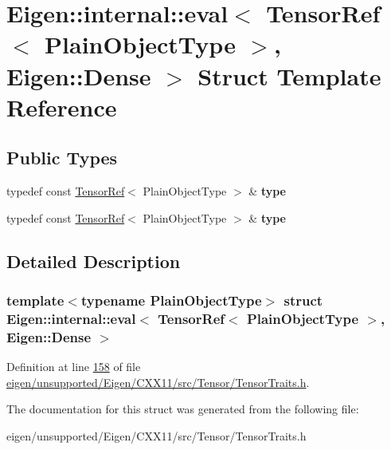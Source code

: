 \hypertarget{struct_eigen_1_1internal_1_1eval_3_01_tensor_ref_3_01_plain_object_type_01_4_00_01_eigen_1_1_dense_01_4}{}\section{Eigen\+:\+:internal\+:\+:eval$<$ Tensor\+Ref$<$ Plain\+Object\+Type $>$, Eigen\+:\+:Dense $>$ Struct Template Reference}
\label{struct_eigen_1_1internal_1_1eval_3_01_tensor_ref_3_01_plain_object_type_01_4_00_01_eigen_1_1_dense_01_4}
\subsection*{Public Types}
\begin{DoxyCompactItemize}
\item 
\mbox{\label{struct_eigen_1_1internal_1_1eval_3_01_tensor_ref_3_01_plain_object_type_01_4_00_01_eigen_1_1_dense_01_4_ab36f4b84827bbef251fdec1fd5c0707a}} 
typedef const \hyperlink{class_eigen_1_1_tensor_ref}{Tensor\+Ref}$<$ Plain\+Object\+Type $>$ \& {\bfseries type}
\item 
\mbox{\label{struct_eigen_1_1internal_1_1eval_3_01_tensor_ref_3_01_plain_object_type_01_4_00_01_eigen_1_1_dense_01_4_ab36f4b84827bbef251fdec1fd5c0707a}} 
typedef const \hyperlink{class_eigen_1_1_tensor_ref}{Tensor\+Ref}$<$ Plain\+Object\+Type $>$ \& {\bfseries type}
\end{DoxyCompactItemize}


\subsection{Detailed Description}
\subsubsection*{template$<$typename Plain\+Object\+Type$>$\newline
struct Eigen\+::internal\+::eval$<$ Tensor\+Ref$<$ Plain\+Object\+Type $>$, Eigen\+::\+Dense $>$}



Definition at line \hyperlink{eigen_2unsupported_2_eigen_2_c_x_x11_2src_2_tensor_2_tensor_traits_8h_source_l00158}{158} of file \hyperlink{eigen_2unsupported_2_eigen_2_c_x_x11_2src_2_tensor_2_tensor_traits_8h_source}{eigen/unsupported/\+Eigen/\+C\+X\+X11/src/\+Tensor/\+Tensor\+Traits.\+h}.



The documentation for this struct was generated from the following file\+:\begin{DoxyCompactItemize}
\item 
eigen/unsupported/\+Eigen/\+C\+X\+X11/src/\+Tensor/\+Tensor\+Traits.\+h\end{DoxyCompactItemize}
